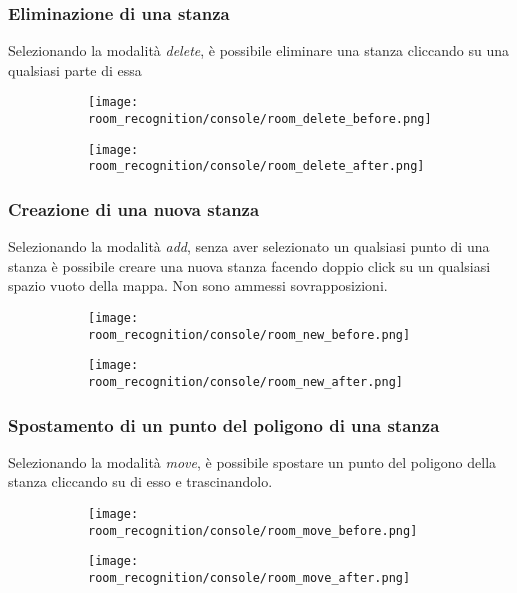 \subsubsection{Eliminazione di una stanza}
Selezionando la modalità \textit{delete}, è possibile eliminare una stanza cliccando su una qualsiasi parte di essa
\begin{figure}[H]
  \begin{subfigure}[t]{0.50\textwidth}
    \centering
    \texttt{[image: room\_recognition/console/room\_delete\_before.png]}
  \end{subfigure}
  \begin{subfigure}[t]{0.50\textwidth}
    \centering
    \texttt{[image: room\_recognition/console/room\_delete\_after.png]}
  \end{subfigure}
\end{figure}

\protect
\subsubsection{Creazione di una nuova stanza}
Selezionando la modalità \textit{add}, senza aver selezionato un qualsiasi punto di una stanza è possibile creare una nuova stanza facendo doppio click su un qualsiasi spazio vuoto della mappa. Non sono ammessi sovrapposizioni.
\begin{figure}[H]
  \begin{subfigure}[t]{0.50\textwidth}
    \centering
    \texttt{[image: room\_recognition/console/room\_new\_before.png]}
  \end{subfigure}
  \begin{subfigure}[t]{0.50\textwidth}
    \centering
    \texttt{[image: room\_recognition/console/room\_new\_after.png]}
  \end{subfigure}
\end{figure}

\protect
\subsubsection{Spostamento di un punto del poligono di una stanza}
Selezionando la modalità \textit{move}, è possibile spostare un punto del poligono della stanza cliccando su di esso e trascinandolo.
\begin{figure}[H]
  \begin{subfigure}[t]{0.50\textwidth}
    \centering
    \texttt{[image: room\_recognition/console/room\_move\_before.png]}
  \end{subfigure}
  \begin{subfigure}[t]{0.50\textwidth}
    \centering
    \texttt{[image: room\_recognition/console/room\_move\_after.png]}
  \end{subfigure}
\end{figure}

